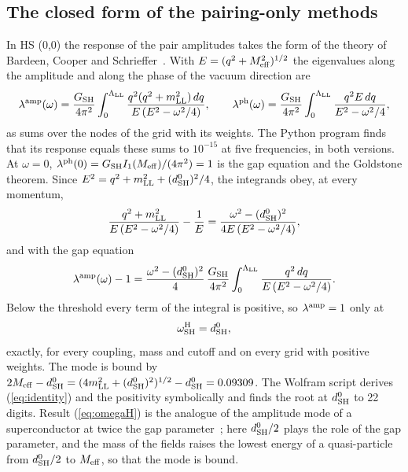 \documentclass[aps,prd,onecolumn,superscriptaddress,nofootinbib,floatfix,longbibliography]{revtex4-2}
\newcommand{\LL}{{\rm LL}}
\newcommand{\SH}{{\rm SH}}
\begin{document}
\subsection{The closed form of the pairing-only methods}

In HS (0,0) the response of the pair amplitudes takes the form of the theory of Bardeen, Cooper and
Schrieffer~\cite{BCS1957}. With $E=(q^2+M_{\rm eff}^2)^{1/2}$ the eigenvalues along the amplitude and along the phase of the
vacuum direction are
\begin{equation}
\lambda^{\rm amp}(\omega)=\frac{G_\SH}{4\pi^2}\int_0^{\Lambda_\LL}\frac{q^2(q^2+m_\LL^2)\,dq}{E\,(E^2-\omega^2/4)},\qquad
\lambda^{\rm ph}(\omega)=\frac{G_\SH}{4\pi^2}\int_0^{\Lambda_\LL}\frac{q^2E\,dq}{E^2-\omega^2/4},
\label{eq:lam}
\end{equation}
as sums over the nodes of the grid with its weights. The Python program finds that its response equals these sums to
\ensuremath{10^{-15}} at five frequencies, in both versions. At $\omega=0$, $\lambda^{\rm ph}(0)=G_\SH I_1(M_{\rm eff})/(4\pi^2)=1$ is the
gap equation and the Goldstone theorem. Since $E^2=q^2+m_\LL^2+(d^0_\SH)^2/4$, the integrands obey, at every momentum,
\begin{equation}
\frac{q^2+m_\LL^2}{E\,(E^2-\omega^2/4)}-\frac1E=\frac{\omega^2-(d^0_\SH)^2}{4E\,(E^2-\omega^2/4)},
\end{equation}
and with the gap equation
\begin{equation}
\lambda^{\rm amp}(\omega)-1=\frac{\omega^2-(d^0_\SH)^2}{4}\,\frac{G_\SH}{4\pi^2}\int_0^{\Lambda_\LL}\frac{q^2\,dq}{E\,(E^2-\omega^2/4)} .
\label{eq:identity}
\end{equation}
Below the threshold every term of the integral is positive, so $\lambda^{\rm amp}=1$ only at
\begin{equation}
\omega^{\rm H}_\SH=d^0_\SH ,
\label{eq:omegaH}
\end{equation}
exactly, for every coupling, mass and cutoff and on every grid with positive weights. The mode is bound by
$2M_{\rm eff}-d^0_\SH=(4m_\LL^2+(d^0_\SH)^2)^{1/2}-d^0_\SH=0.09309$. The Wolfram script derives (\ref{eq:identity}) and the
positivity symbolically and finds the root at $d^0_\SH$ to 22 digits. Result (\ref{eq:omegaH}) is the analogue of the
amplitude mode of a superconductor at twice the gap parameter~\cite{LittlewoodVarma1981,PekkerVarma2015}; here $d^0_\SH/2$
plays the role of the gap parameter, and the mass of the fields raises the lowest energy of a quasi-particle from
$d^0_\SH/2$ to $M_{\rm eff}$, so that the mode is bound.
\end{document}
